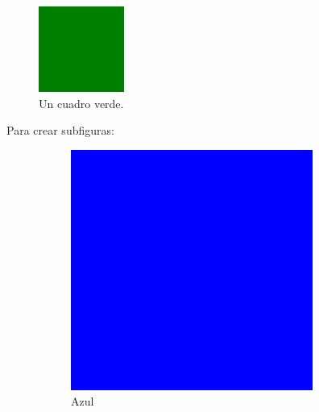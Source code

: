 \begin{figure}[H]
	\centering
	\includegraphics[width =0.25\textwidth]{./img/green.png}
	\caption{Un cuadro verde.}
\end{figure}

Para crear subfiguras:

\begin{figure}[H]
	\centering
	\begin{subfigure}{0.3\textwidth}
		\includegraphics[width=\textwidth]{./img/blue.png}
		\caption{Azul}
	\end{subfigure}
	\begin{subfigure}{0.3\textwidth}

\end{subfigure}
\end{figure}
